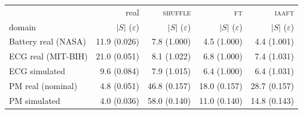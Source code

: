 \begin{tabular}{lrrrr}
\toprule
 & real & \textsc{shuffle} & \textsc{ft} & \textsc{iaaft} \\
domain & $|S|$ ($\varepsilon$) & $|S|$ ($\varepsilon$) & $|S|$ ($\varepsilon$) & $|S|$ ($\varepsilon$) \\
\midrule
Battery real (NASA) & 11.9 (0.026) & 7.8 (1.000) & 4.5 (1.000) & 4.4 (1.001) \\
ECG real (MIT-BIH) & 21.0 (0.051) & 8.1 (1.022) & 6.8 (1.000) & 7.4 (1.031) \\
ECG simulated & 9.6 (0.084) & 7.9 (1.015) & 6.4 (1.000) & 6.4 (1.031) \\
PM real (nominal) & 4.8 (0.051) & 46.8 (0.157) & 18.0 (0.157) & 28.7 (0.157) \\
PM simulated & 4.0 (0.036) & 58.0 (0.140) & 11.0 (0.140) & 14.8 (0.143) \\
\bottomrule
\end{tabular}
